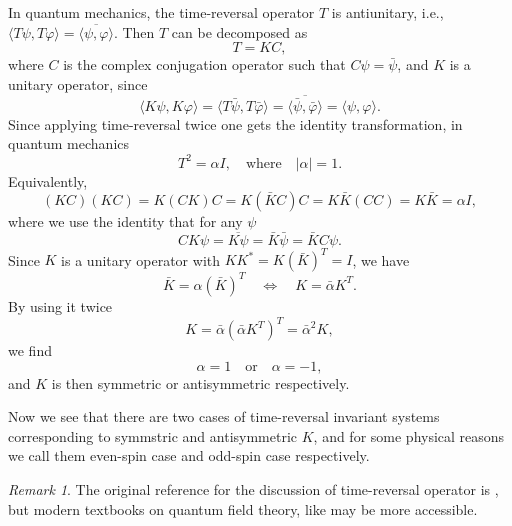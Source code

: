 \documentclass[11pt, a4paper]{article}
\numberwithin{equation}{section}
\newcommand{\ie}{i.e.}
\theoremstyle{definition}
\theoremstyle{remark}
\newtheorem{rmk}{Remark}
\begin{document}
In quantum mechanics, the time-reversal operator $T$ is antiunitary, \ie, $\langle T \psi, T \varphi \rangle = \overline{\langle \psi, \varphi \rangle}$. Then $T$ can be decomposed as
\begin{equation}
  T = KC,
\end{equation}
where $C$ is the complex conjugation operator such that $C \psi = \bar{\psi}$, and $K$ is a unitary operator, since
\begin{equation}
  \langle K \psi, K \varphi \rangle = \langle T \bar{\psi}, T \bar{\varphi} \rangle = \overline{\langle \bar{\psi}, \bar{\varphi} \rangle} = \langle \psi, \varphi \rangle.
\end{equation}
Since applying time-reversal twice one gets the identity transformation, in quantum mechanics
\begin{equation}
  T^2 = \alpha I, \quad \text{where} \quad \lvert \alpha \rvert = 1.
\end{equation}
Equivalently,
\begin{equation}
  (KC)(KC) = K(CK)C = K(\bar{K}C)C = K\bar{K}(CC) = K\bar{K} = \alpha I,
\end{equation}
where we use the identity that for any $\psi$
\begin{equation}
  CK \psi = \overline{K \psi} = \bar{K} \bar{\psi} = \bar{K}C \psi.
\end{equation}
Since $K$ is a unitary operator with $KK^* = K(\bar{K})^T = I$, we have
\begin{equation}
  \bar{K} = \alpha(\bar{K})^T \quad \Leftrightarrow \quad K = \bar{\alpha}K^T.
\end{equation}
By using it twice
\begin{equation}
  K = \bar{\alpha}(\bar{\alpha} K^T)^T = \bar{\alpha}^2 K,
\end{equation}
we find
\begin{equation}
  \alpha = 1 \quad \text{or} \quad \alpha = -1,
\end{equation}
and $K$ is then symmetric or antisymmetric respectively.

Now we see that there are two cases of time-reversal invariant systems corresponding to symmstric and antisymmetric $K$, and for some physical reasons we call them even-spin case and odd-spin case respectively.

\begin{rmk}
  The original reference for the discussion of time-reversal operator is \cite{Wigner59}, but modern textbooks on quantum field theory, like \cite{Weinberg05} may be more accessible.
\end{rmk}
\end{document}
